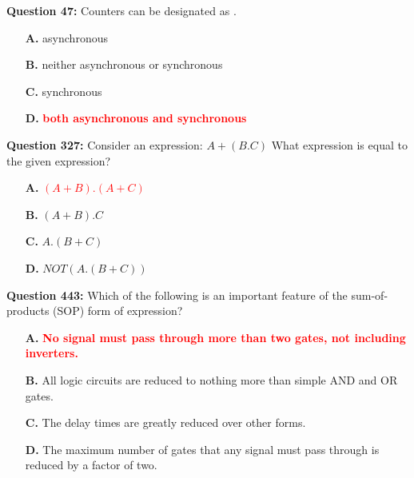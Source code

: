 \documentclass[12pt,a4paper]{article}
\begin{document}
\vspace{0.5cm}

\vspace{0.5cm}

\textbf{Question 47:} Counters can be designated as \underline{\hspace{1.5cm}}.

\begin{itemize}
    \item[\textbf{A.}] asynchronous
    \item[\textbf{B.}] neither asynchronous or synchronous
    \item[\textbf{C.}] synchronous
    \item[\textbf{D.}] \textcolor{red}{\textbf{both asynchronous and synchronous}}
\end{itemize}

\vspace{0.5cm}

\vspace{0.5cm}

\vspace{0.5cm}

\vspace{0.5cm}

\textbf{Question 327:} Consider an expression: $A + (B.C)$ What expression is equal to the given expression?

\begin{itemize}
    \item[\textbf{A.}] \textcolor{red}{\textbf{$(A + B).(A + C)$}}
    \item[\textbf{B.}] $(A + B).C$
    \item[\textbf{C.}] $A.(B + C)$
    \item[\textbf{D.}] $NOT(A.(B + C))$
\end{itemize}

\vspace{0.5cm}

\vspace{0.5cm}

\textbf{Question 443:} \underline{\hspace{1.5cm}}Which of the following is an important feature of the sum-of-products (SOP) form of expression?

\begin{itemize}
    \item[\textbf{A.}] \textcolor{red}{\textbf{No signal must pass through more than two gates, not including inverters.}}
    \item[\textbf{B.}] All logic circuits are reduced to nothing more than simple AND and OR gates.
    \item[\textbf{C.}] The delay times are greatly reduced over other forms.
    \item[\textbf{D.}] The maximum number of gates that any signal must pass through is reduced by a factor of two.
\end{itemize}
\end{document}
